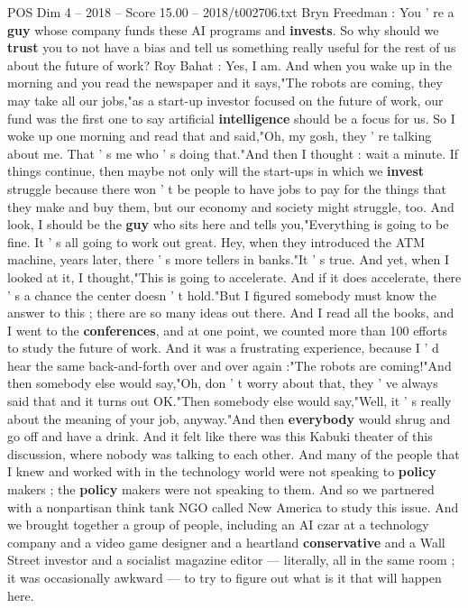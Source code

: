 \begin{textsample}{POS Dim 4 – 2018 – Score 15.00 – 2018/t002706.txt}  \label{ex:f4_pos_065}
Bryn Freedman : You ' re a \textbf{guy} whose company funds these AI programs and \textbf{invests}.
So why should we \textbf{trust} you to not have a bias and tell us something really useful for the rest of us about the future of work?
Roy Bahat : Yes, I am.
And when you wake up in the morning and you read the newspaper and it says,"The robots are coming, they may take all our jobs,"as a start-up investor focused on the future of work, our fund was the first one to say artificial \textbf{intelligence} should be a focus for us.
So I woke up one morning and read that and said,"Oh, my gosh, they ' re talking about me.
That ' s me who ' s doing that."And then I thought : wait a minute.
If things continue, then maybe not only will the start-ups in which we \textbf{invest} struggle because there won ' t be people to have jobs to pay for the things that they make and buy them, but our economy and society might struggle, too.
And look, I should be the \textbf{guy} who sits here and tells you,"Everything is going to be fine.
It ' s all going to work out great.
Hey, when they introduced the ATM machine, years later, there ' s more tellers in banks."It ' s true.
And yet, when I looked at it, I thought,"This is going to accelerate.
And if it does accelerate, there ' s a chance the center doesn ' t hold."But I figured somebody must know the answer to this ; there are so many ideas out there.
And I read all the books, and I went to the \textbf{conferences}, and at one point, we counted more than 100 efforts to study the future of work.
And it was a frustrating experience, because I ' d hear the same back-and-forth over and over again :"The robots are coming!"And then somebody else would say,"Oh, don ' t worry about that, they ' ve always said that and it turns out OK."Then somebody else would say,"Well, it ' s really about the meaning of your job, anyway."And then \textbf{everybody} would shrug and go off and have a drink.
And it felt like there was this Kabuki theater of this discussion, where nobody was talking to each other.
And many of the people that I knew and worked with in the technology world were not speaking to \textbf{policy} makers ; the \textbf{policy} makers were not speaking to them.
And so we partnered with a nonpartisan think tank NGO called New America to study this issue.
And we brought together a group of people, including an AI czar at a technology company and a video game designer and a heartland \textbf{conservative} and a Wall Street investor and a socialist magazine editor — literally, all in the same room ; it was occasionally awkward — to try to figure out what is it that will happen here.

\end{textsample}
